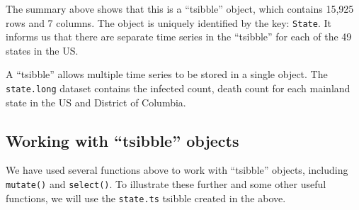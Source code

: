 \documentclass[]{book}
\begin{document}
The summary above shows that this is a ``tsibble'' object, which
contains 15,925 rows and 7 columns. The object is uniquely identified by
the key: \texttt{State}. It informs us that there are separate time
series in the ``tsibble'' for each of the 49 states in the US.

A ``tsibble'' allows multiple time series to be stored in a single
object. The \texttt{state.long} dataset contains the infected count,
death count for each mainland state in the US and District of Columbia.

\subsection{\texorpdfstring{Working with ``tsibble''
objects}{Working with tsibble objects}}\label{working-with-tsibble-objects}

We have used several functions above to work with ``tsibble'' objects,
including \texttt{mutate()} and \texttt{select()}. To illustrate these
further and some other useful functions, we will use the
\texttt{state.ts} tsibble created in the above.
\end{document}
